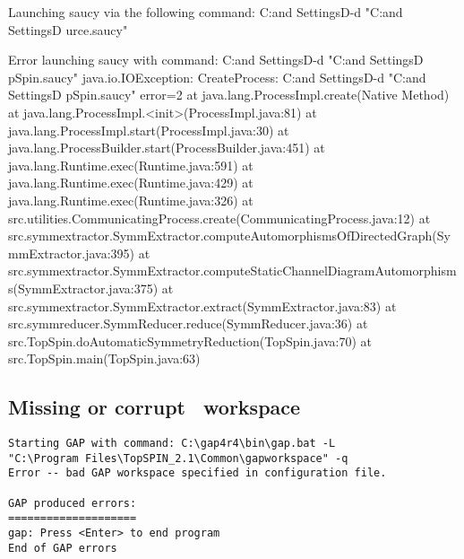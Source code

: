 Launching saucy via the following command: C:\Documents and Settings\Ally D\TopSPINSource\TopSpin\saucy -d "C:\Documents and Settings\Ally D\TopSPINSo
urce\TopSpin\Commongraph.saucy"

Error launching saucy with command: C:\Documents and Settings\Ally D\TopSPINSource\TopSpin\saucy -d "C:\Documents and Settings\Ally D\TopSPINSource\To
pSpin\Commongraph.saucy"
java.io.IOException: CreateProcess: C:\Documents and Settings\Ally D\TopSPINSource\TopSpin\saucy -d "C:\Documents and Settings\Ally D\TopSPINSource\To
pSpin\Commongraph.saucy" error=2
        at java.lang.ProcessImpl.create(Native Method)
        at java.lang.ProcessImpl.<init>(ProcessImpl.java:81)
        at java.lang.ProcessImpl.start(ProcessImpl.java:30)
        at java.lang.ProcessBuilder.start(ProcessBuilder.java:451)
        at java.lang.Runtime.exec(Runtime.java:591)
        at java.lang.Runtime.exec(Runtime.java:429)
        at java.lang.Runtime.exec(Runtime.java:326)
        at src.utilities.CommunicatingProcess.create(CommunicatingProcess.java:12)
        at src.symmextractor.SymmExtractor.computeAutomorphismsOfDirectedGraph(SymmExtractor.java:395)
        at src.symmextractor.SymmExtractor.computeStaticChannelDiagramAutomorphisms(SymmExtractor.java:375)
        at src.symmextractor.SymmExtractor.extract(SymmExtractor.java:83)
        at src.symmreducer.SymmReducer.reduce(SymmReducer.java:36)
        at src.TopSpin.doAutomaticSymmetryReduction(TopSpin.java:70)
        at src.TopSpin.main(TopSpin.java:63)




\subsection{Missing or corrupt \protect\gap\ workspace}


\exampleerrormessage

\begin{lstlisting}
Starting GAP with command: C:\gap4r4\bin\gap.bat -L
"C:\Program Files\TopSPIN_2.1\Common\gapworkspace" -q
Error -- bad GAP workspace specified in configuration file.

GAP produced errors:
====================
gap: Press <Enter> to end program
End of GAP errors
\end{lstlisting}

